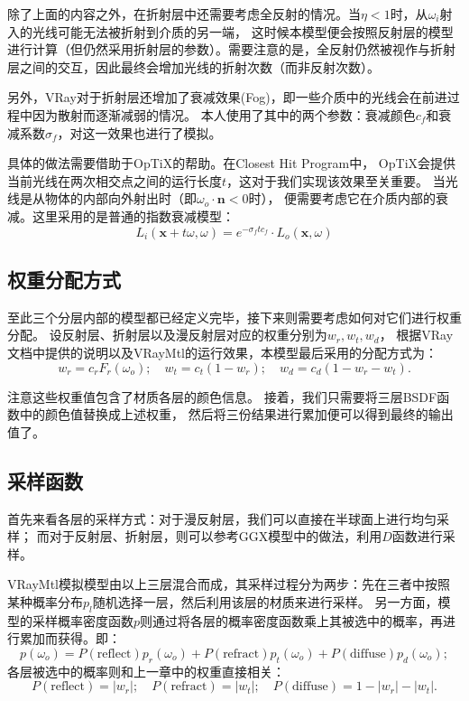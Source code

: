 除了上面的内容之外，在折射层中还需要考虑全反射的情况。当$\eta<1$时，从$\omega_i$射入的光线可能无法被折射到介质的另一端，
这时候本模型便会按照反射层的模型进行计算（但仍然采用折射层的参数）。需要注意的是，全反射仍然被视作与折射层之间的交互，因此最终会增加光线的折射次数（而非反射次数）。

另外，VRay对于折射层还增加了衰减效果(Fog)，即一些介质中的光线会在前进过程中因为散射而逐渐减弱的情况。
本人使用了其中的两个参数：衰减颜色$c_f$和衰减系数$\sigma_f$，对这一效果也进行了模拟。

具体的做法需要借助于OpTiX的帮助。在Closest Hit Program中，
OpTiX会提供当前光线在两次相交点之间的运行长度$t$，这对于我们实现该效果至关重要。
当光线是从物体的内部向外射出时（即$\omega_o\cdot \textbf{n} < 0$时），
便需要考虑它在介质内部的衰减。这里采用的是普通的指数衰减模型：
\begin{equation}
   L_i(\textbf{x}+t\omega, \omega) = e^{-\sigma_f t c_f}\cdot L_o(\textbf{x}, \omega) 
\end{equation}

\subsection{权重分配方式}

至此三个分层内部的模型都已经定义完毕，接下来则需要考虑如何对它们进行权重分配。
设反射层、折射层以及漫反射层对应的权重分别为$w_r, w_t, w_d$，
根据VRay文档中提供的说明以及VRayMtl的运行效果，本模型最后采用的分配方式为：
\begin{equation}
w_r = c_rF_r(\omega_o) ; \quad w_t = c_t(1-w_r) ; \quad w_d = c_d(1-w_r-w_t).
\end{equation}

注意这些权重值包含了材质各层的颜色信息。
接着，我们只需要将三层BSDF函数中的颜色值替换成上述权重，
然后将三份结果进行累加便可以得到最终的输出值了。

\subsection{采样函数}
\label{VRaySample}
首先来看各层的采样方式：对于漫反射层，我们可以直接在半球面上进行均匀采样；
而对于反射层、折射层，则可以参考GGX模型中的做法，利用$D$函数进行采样。

VRayMtl模拟模型由以上三层混合而成，其采样过程分为两步：先在三者中按照某种概率分布$p_{l}$随机选择一层，然后利用该层的材质来进行采样。
另一方面，模型的采样概率密度函数$p$则通过将各层的概率密度函数乘上其被选中的概率，再进行累加而获得。即：
\begin{equation}
p(\omega_o) = P(\text{reflect})p_r(\omega_o)+P(\text{refract})p_t(\omega_o)+P(\text{diffuse})p_d(\omega_o);
\end{equation}
各层被选中的概率则和上一章中的权重直接相关：
\begin{equation}
    P(\text{reflect}) = |w_r|; \quad P(\text{refract}) = |w_t|; \quad P(\text{diffuse}) = 1-|w_r|-|w_t|.
\end{equation}
    
